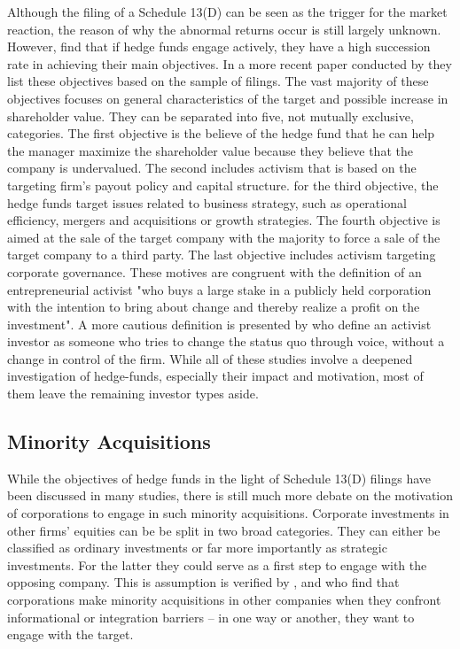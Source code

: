 \documentclass[12pt]{article}
\begin{document}
Although the filing of a Schedule 13(D) can be seen as the trigger for the market reaction, the reason of why the abnormal returns occur is still largely unknown. However, \citet{Brav2008} find that if hedge funds engage actively, they have a high succession rate in achieving their main objectives. In a more recent paper conducted by \citet[p.12]{Brav2009} they list these objectives based on the sample of filings. The vast majority of these objectives focuses on general characteristics of the target and possible increase in shareholder value. They can be separated into five, not mutually exclusive, categories. The first objective is the believe of the hedge fund that he can help the manager maximize the shareholder value because they believe that the company is undervalued. The second includes activism that is based on the targeting firm's payout policy and capital structure. for the third objective, the hedge funds target issues related to business strategy, such as operational efficiency, mergers and acquisitions or growth strategies. The fourth objective is aimed at the sale of the target company with the majority to force a sale of the target company to a third party. The last objective includes activism targeting corporate governance. These motives are congruent with the \citet{Klein2009} definition of an entrepreneurial activist "who buys a large stake in a publicly held corporation with the intention to bring about change and thereby realize a profit on the investment". A more cautious definition is presented by \citet{Greenwood2009} who define an activist investor as someone who tries to change the status quo through voice, without a change in control of the firm. While all of these studies involve a deepened investigation of hedge-funds, especially their impact and motivation, most of them leave the remaining investor types aside.

\subsection{Minority Acquisitions}

While the objectives of hedge funds in the light of Schedule 13(D) filings  have been discussed in many studies, there is still much more debate on the motivation of corporations to engage in such minority acquisitions. 
Corporate investments in other firms' equities can be be split in two broad categories. They can either be classified as ordinary investments or far more importantly as strategic investments. For the latter they could serve as a first step to engage with the opposing company. This is assumption is verified by \citet{Allen2000}, \citet{Ouimet2013} and \citet{Huang2017} who find that corporations make minority acquisitions in other companies when they confront informational or integration barriers -- in one way or another, they want to engage with the target.
\end{document}
